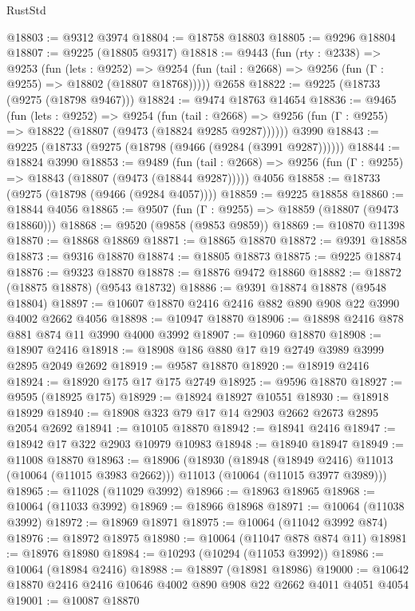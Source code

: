 \begin{lexlean}{RustStd}
\begin{coremodule}
@18803 := @9312 @3974
@18804 := @18758 @18803
@18805 := @9296 @18804
@18807 := @9225 (@18805 @9317)
@18818 := @9443
    (fun (rty : @2338) =>
    @9253
      (fun (lets : @9252) =>
      @9254 (fun (tail : @2668) => @9256 (fun (Γ : @9255) => @18802 (@18807 @18768)))))
    @2658
@18822 := @9225 (@18733 (@9275 (@18798 @9467)))
@18824 := @9474 @18763 @14654
@18836 := @9465
    (fun (lets : @9252) =>
    @9254
      (fun (tail : @2668) =>
      @9256 (fun (Γ : @9255) => @18822 (@18807 (@9473 (@18824 @9285 @9287))))))
    @3990
@18843 := @9225 (@18733 (@9275 (@18798 (@9466 (@9284 (@3991 @9287))))))
@18844 := @18824 @3990
@18853 := @9489
    (fun (tail : @2668) => @9256 (fun (Γ : @9255) => @18843 (@18807 (@9473 (@18844 @9287)))))
    @4056
@18858 := @18733 (@9275 (@18798 (@9466 (@9284 @4057))))
@18859 := @9225 @18858
@18860 := @18844 @4056
@18865 := @9507 (fun (Γ : @9255) => @18859 (@18807 (@9473 @18860)))
@18868 := @9520 (@9858 (@9853 @9859))
@18869 := @10870 @11398
@18870 := @18868 @18869
@18871 := @18865 @18870
@18872 := @9391 @18858
@18873 := @9316 @18870
@18874 := @18805 @18873
@18875 := @9225 @18874
@18876 := @9323 @18870
@18878 := @18876 @9472 @18860
@18882 := @18872 (@18875 @18878) (@9543 @18732)
@18886 := @9391 @18874 @18878 (@9548 @18804)
@18897 := @10607 @18870 @2416 @2416 @882 @890 @908 @22 @3990 @4002 @2662 @4056
@18898 := @10947 @18870
@18906 := @18898 @2416 @878 @881 @874 @11 @3990 @4000 @3992
@18907 := @10960 @18870
@18908 := @18907 @2416
@18918 := @18908 @186 @880 @17 @19 @2749 @3989 @3999 @2895 @2049 @2692
@18919 := @9587 @18870
@18920 := @18919 @2416
@18924 := @18920 @175 @17 @175 @2749
@18925 := @9596 @18870
@18927 := @9595 (@18925 @175)
@18929 := @18924 @18927 @10551
@18930 := @18918 @18929
@18940 := @18908 @323 @79 @17 @14 @2903 @2662 @2673 @2895 @2054 @2692
@18941 := @10105 @18870
@18942 := @18941 @2416
@18947 := @18942 @17 @322 @2903 @10979 @10983
@18948 := @18940 @18947
@18949 := @11008 @18870
@18963 := @18906
    (@18930
      (@18948 (@18949 @2416) @11013 (@10064 (@11015 @3983 @2662)))
      @11013
      (@10064 (@11015 @3977 @3989)))
@18965 := @11028 (@11029 @3992)
@18966 := @18963 @18965
@18968 := @10064 (@11033 @3992)
@18969 := @18966 @18968
@18971 := @10064 (@11038 @3992)
@18972 := @18969 @18971
@18975 := @10064 (@11042 @3992 @874)
@18976 := @18972 @18975
@18980 := @10064 (@11047 @878 @874 @11)
@18981 := @18976 @18980
@18984 := @10293 (@10294 (@11053 @3992))
@18986 := @10064 (@18984 @2416)
@18988 := @18897 (@18981 @18986)
@19000 := @10642 @18870 @2416 @2416 @10646 @4002 @890 @908 @22 @2662 @4011 @4051 @4054
@19001 := @10087 @18870

\end{coremodule}
\end{lexlean}
